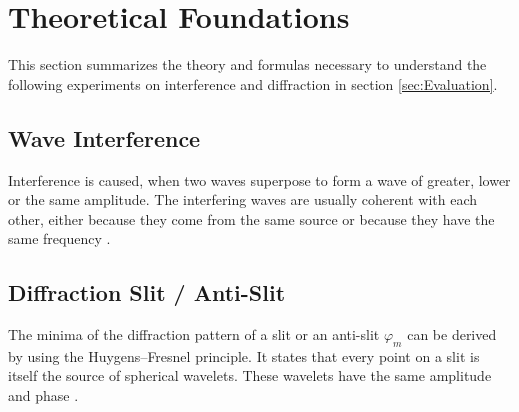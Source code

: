 \section{Theoretical Foundations}
\label{sec:Theoretical_Foundations}
This section summarizes the theory and formulas necessary to understand the following experiments on interference and diffraction in section \ref{sec:Evaluation}.

\subsection{Wave Interference}
\label{subsec:Interference}
Interference is caused, when two waves superpose to form a wave of greater, lower or the same amplitude. The interfering waves are usually coherent with each other, either because they come from the same source or because they have the same frequency \cite{diffraction}.

\subsection{Diffraction Slit / Anti-Slit}
\label{subsec:Diffraction_Slit}
The minima of the diffraction pattern of a slit or an anti-slit $\varphi_m$ can be derived by using the Huygens–Fresnel principle. It states that every point on a slit is itself the source of spherical wavelets. These wavelets have the same amplitude and phase \cite{diffraction}.

